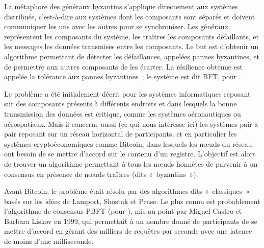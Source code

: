 
La métaphore des généraux byzantins s'applique directement aux systèmes distribués, c'est-à-dire aux systèmes dont les composants sont séparés et doivent communiquer les uns avec les autres pour se synchroniser. Les généraux représentent les composants du système, les traîtres les composants défaillants, et les messages les données transmises entre les composants. Le but est d'obtenir un algorithme permettant de détecter les défaillances, appelées pannes byzantines, et de permettre aux autres composants de les écarter. La résilience obtenue est appelée la tolérance aux pannes byzantines~; le système est dit BFT, pour .

Le problème a été initialement décrit pour les systèmes informatiques reposant sur des composants présents à différents endroits et dans lesquels la bonne transmission des données est critique, comme les systèmes aéronautiques ou aérospatiaux. Mais il concerne aussi (ce qui nous intéresse ici) les systèmes pair à pair reposant sur un réseau horizontal de participants, et en particulier les systèmes cryptoéconomiques comme Bitcoin, dans lesquels les nœuds du réseau ont besoin de se mettre d'accord sur le contenu d'un registre. L'objectif est alors de trouver un algorithme permettant à tous les nœuds honnêtes de parvenir à un consensus en présence de nœuds traîtres (dits «~byzantins~»).



Avant Bitcoin, le problème était résolu par des algorithmes dits «~classiques~» basés sur les idées de Lamport, Shostak et Pease. Le plus connu est probablement l'algorithme de consensus PBFT (pour ), mis au point par Miguel Castro et Barbara Liskov en 1999, qui permettait à un nombre donné de participants de se mettre d'accord en gérant des milliers de requêtes par seconde avec une latence de moins d'une milliseconde.

